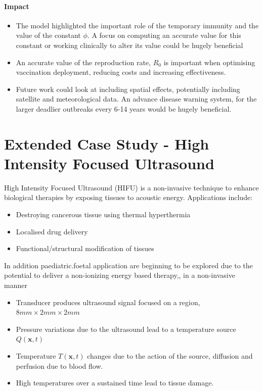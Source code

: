 \documentclass[11pt]{article} %
\begin{document}
\paragraph{Impact}

\begin{itemize}
	\item The model highlighted the important role of the temporary immunity and the value of the constant $\phi$. A focus on computing an accurate value for this constant or working clinically to alter its value could be hugely beneficial
	\item An accurate value of the reproduction rate, $ R_0 $ is important when optimising vaccination deployment, reducing costs and increasing effectiveness. 
	\item Future work could look at including spatial effects, potentially including satellite and meteorological data. An advance disease warning system, for the larger deadlier outbreaks every 6-14 years would be hugely beneficial. 
\end{itemize}
	
	\section{Extended Case Study - High Intensity Focused Ultrasound}
	
	High Intensity Focused Ultrasound (HIFU) is a non-invasive technique to enhance biological therapies by exposing tissues to acoustic energy. Applications include:
	\begin{itemize}
		\item Destroying cancerous tissue using thermal hyperthermia 
		\item Localised drug delivery 
		\item Functional/structural modification of tissues
	\end{itemize}
In addition paediatric.foetal application are beginning to be explored due to the potential to deliver a non-ionizing energy based therapy,, in a non-invasive manner 
	\begin{itemize}
		\item Transducer produces ultrasound signal focused on a region, $8mm\times2mm\times2mm$
		\item Pressure variations due to the ultrasound lead to a temperature source $Q(\textbf{x},t)$
		\item Temperature $T(\textbf{x},t)$ changes due to the action of the source, diffusion and perfusion due to blood flow. 
		\item High temperatures over a sustained time lead to tissue damage. 
	\end{itemize}
	
\end{document}
